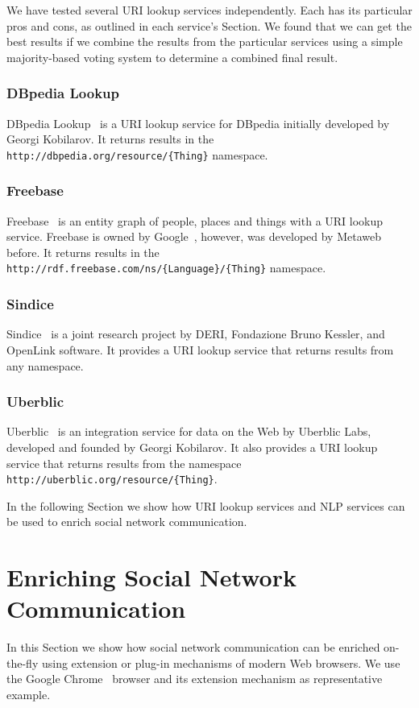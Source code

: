 \documentclass[12pt]{article}
\begin{document}
We have tested several URI lookup services independently. Each has its particular pros and cons, as outlined in each service's Section. We found that we can get the best results if we combine the results from the particular services using a simple majority-based voting system to determine a combined final result.

\subsubsection{DBpedia Lookup}
DBpedia Lookup~\cite{kobilarov} is a URI lookup service for DBpedia initially developed by Georgi Kobilarov. It returns results in the \texttt{http://dbpedia.org/\-resource/\-\{Thing\}} namespace.

\subsubsection{Freebase}
Freebase~\cite{NYTimes:Freebase} is an entity graph of people, places and things with a URI lookup service. Freebase is owned by Google~\cite{metaweb}, however, was developed by Metaweb before. It returns results in the \texttt{http://rdf.freebase.com/ns/\-\{Language\}/\{Thing\}} namespace.

\subsubsection{Sindice}
Sindice~\cite{Tummarello:Sindice} is a joint research project by DERI, Fondazione Bruno Kessler, and OpenLink software. It provides a URI lookup service that returns results from any namespace.

\subsubsection{Uberblic}
Uberblic~\cite{Kobilarov:Uberblic} is an integration service for data on the Web by Uberblic Labs, developed and founded by Georgi Kobilarov. It also provides a URI lookup service that returns results from the namespace
\texttt{http://uberblic.org/\-resource/\{Thing\}}.

In the following Section we show how URI lookup services and NLP services can be used to enrich social network communication.

\section{Enriching Social Network Communication}
In this Section we show how social network communication can be enriched on-the-fly using extension or plug-in mechanisms of modern Web browsers. We use the Google Chrome~\cite{google:chrome} browser and its extension mechanism as representative example.
\end{document}

